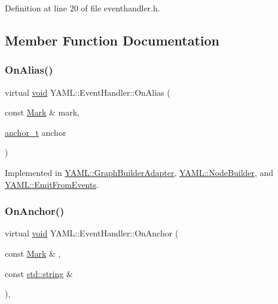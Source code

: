 Definition at line 20 of file eventhandler.\+h.



\subsection{Member Function Documentation}
\mbox{\label{class_y_a_m_l_1_1_event_handler_a3459009c2aad49b3226e009fc06d33b6}} 
\subsubsection{\texorpdfstring{OnAlias()}{OnAlias()}}
{\footnotesize\ttfamily virtual \mbox{\hyperlink{glad_8h_a950fc91edb4504f62f1c577bf4727c29}{void}} Y\+A\+M\+L\+::\+Event\+Handler\+::\+On\+Alias (\begin{DoxyParamCaption}\item[{const \mbox{\hyperlink{struct_y_a_m_l_1_1_mark}{Mark}} \&}]{mark,  }\item[{\mbox{\hyperlink{namespace_y_a_m_l_abeff1798814ae3402fc5665fdcad1de6}{anchor\+\_\+t}}}]{anchor }\end{DoxyParamCaption})\hspace{0.3cm}{\ttfamily [pure virtual]}}



Implemented in \mbox{\hyperlink{class_y_a_m_l_1_1_graph_builder_adapter_aa1563479f8a72f7182f0319637050eb5}{Y\+A\+M\+L\+::\+Graph\+Builder\+Adapter}}, \mbox{\hyperlink{class_y_a_m_l_1_1_node_builder_a4d4b147301ef0a70bd3e09ccdb5a7a30}{Y\+A\+M\+L\+::\+Node\+Builder}}, and \mbox{\hyperlink{class_y_a_m_l_1_1_emit_from_events_aa002fddfe2450e68bb7dc58c8245b702}{Y\+A\+M\+L\+::\+Emit\+From\+Events}}.

\mbox{\label{class_y_a_m_l_1_1_event_handler_a6abc848eb0289f32ec97a00ac52b392c}} 
\subsubsection{\texorpdfstring{OnAnchor()}{OnAnchor()}}
{\footnotesize\ttfamily virtual \mbox{\hyperlink{glad_8h_a950fc91edb4504f62f1c577bf4727c29}{void}} Y\+A\+M\+L\+::\+Event\+Handler\+::\+On\+Anchor (\begin{DoxyParamCaption}\item[{const \mbox{\hyperlink{struct_y_a_m_l_1_1_mark}{Mark}} \&}]{,  }\item[{const \mbox{\hyperlink{glad_8h_ac83513893df92266f79a515488701770}{std\+::string}} \&}]{ }\end{DoxyParamCaption})\hspace{0.3cm}{\ttfamily [inline]}, {\ttfamily [virtual]}}



